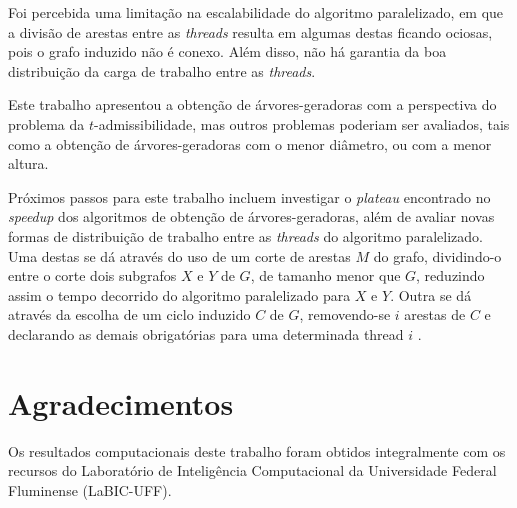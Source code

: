 \documentclass[article,a4paper,12pt,brazil,sumario=tradicional]{abntex2}
\theoremstyle{definition} %
\begin{document}
Foi percebida uma limitação na escalabilidade do algoritmo paralelizado, em que a divisão de arestas entre as \textit{threads} resulta em algumas destas ficando ociosas, pois o grafo induzido não é conexo. Além disso, não há garantia da boa distribuição da carga de trabalho entre as \textit{threads}.

Este trabalho apresentou a obtenção de árvores-geradoras com a perspectiva do problema da $t$-admissibilidade, mas outros problemas poderiam ser avaliados, tais como a obtenção de árvores-geradoras com o menor diâmetro, ou com a menor altura.

Próximos passos para este trabalho incluem investigar o \textit{plateau} encontrado no \textit{speedup} dos algoritmos de obtenção de árvores-geradoras, além de avaliar novas formas de distribuição de trabalho entre as \textit{threads} do algoritmo paralelizado. Uma destas se dá através do uso de um corte de arestas $M$ do grafo, dividindo-o entre o corte dois subgrafos $X$ e $Y$ de $G$, de tamanho menor que $G$, reduzindo assim o tempo decorrido do algoritmo paralelizado para $X$ e $Y$. Outra se dá através da escolha de um ciclo induzido $C$ de $G$, removendo-se $i$ arestas de $C$ e declarando as demais obrigatórias para uma determinada thread $i$ \cite{cunha_marciano_moraes_santiago_santos}.

\clearpage


\newpage
\renewcommand{\listfigurename}{APÊNDICE A - Lista de ilustrações}
\listoffigures


\newpage
\chapter*{Agradecimentos}
\noindent

Os resultados computacionais deste trabalho foram obtidos integralmente com os recursos do Laboratório de Inteligência Computacional da Universidade Federal Fluminense (LaBIC-UFF).
\end{document}
